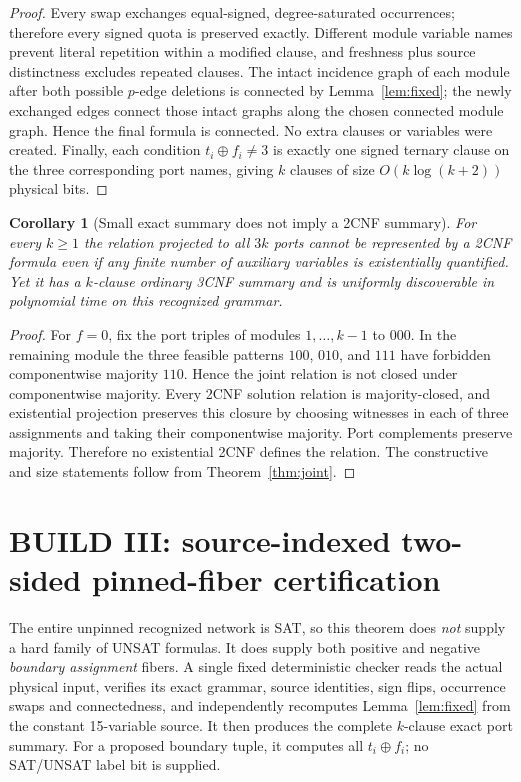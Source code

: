 \documentclass[11pt]{article}
\newtheorem{corollary}[theorem]{Corollary}
\begin{document}
\begin{proof}
Every swap exchanges equal-signed, degree-saturated occurrences; therefore every signed quota is preserved exactly. Different module variable names prevent literal repetition within a modified clause, and freshness plus source distinctness excludes repeated clauses. The intact incidence graph of each module after both possible $p$-edge deletions is connected by Lemma~\ref{lem:fixed}; the newly exchanged edges connect those intact graphs along the chosen connected module graph. Hence the final formula is connected. No extra clauses or variables were created. Finally, each condition $t_i\oplus f_i\ne3$ is exactly one signed ternary clause on the three corresponding port names, giving $k$ clauses of size $O(k\log(k+2))$ physical bits.
\end{proof}

\begin{corollary}[Small exact summary does not imply a 2CNF summary]\label{cor:nonbij}
For every $k\ge1$ the relation projected to all $3k$ ports cannot be represented by a 2CNF formula even if any finite number of auxiliary variables is existentially quantified. Yet it has a $k$-clause ordinary 3CNF summary and is uniformly discoverable in polynomial time on this recognized grammar.
\end{corollary}
\begin{proof}
For $f=0$, fix the port triples of modules $1,\ldots,k-1$ to $000$. In the remaining module the three feasible patterns $100$, $010$, and $111$ have forbidden componentwise majority $110$. Hence the joint relation is not closed under componentwise majority. Every 2CNF solution relation is majority-closed, and existential projection preserves this closure by choosing witnesses in each of three assignments and taking their componentwise majority. Port complements preserve majority. Therefore no existential 2CNF defines the relation. The constructive and size statements follow from Theorem~\ref{thm:joint}.
\end{proof}

\section{BUILD III: source-indexed two-sided pinned-fiber certification}
The entire unpinned recognized network is SAT, so this theorem does \emph{not} supply a hard family of UNSAT formulas. It does supply both positive and negative \emph{boundary assignment} fibers. A single fixed deterministic checker reads the actual physical input, verifies its exact grammar, source identities, sign flips, occurrence swaps and connectedness, and independently recomputes Lemma~\ref{lem:fixed} from the constant 15-variable source. It then produces the complete $k$-clause exact port summary. For a proposed boundary tuple, it computes all $t_i\oplus f_i$; no SAT/UNSAT label bit is supplied.
\end{document}

